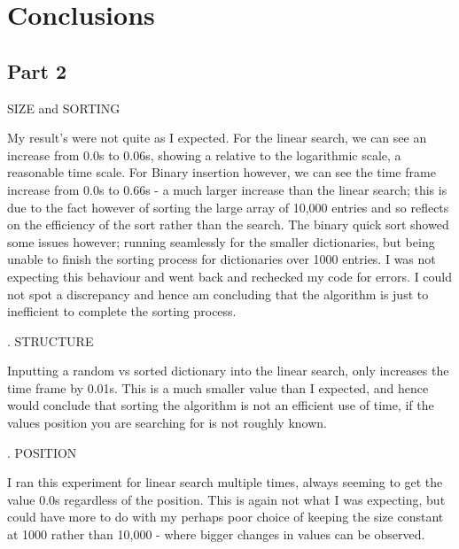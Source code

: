 \documentclass{article}
\begin{document}
\section{Conclusions}
\label{sec:conclusions}

\subsection{Part 2}


SIZE and SORTING\newline


My result's were not quite as I expected. For the linear search, we can see an increase from 0.0s to 0.06s, showing a relative to the logarithmic scale, a reasonable time scale. For Binary insertion however, we can see the time frame increase from 0.0s to 0.66s - a much larger increase than the linear search; this is due to the fact however of sorting the large array of 10,000 entries and so reflects on the efficiency of the sort rather than the search. The binary quick sort showed some issues however; running seamlessly for the smaller dictionaries, but being unable to finish the sorting process for dictionaries over 1000 entries. I was not expecting this behaviour and went back and rechecked my code for errors. I could not spot a discrepancy and hence am concluding that the algorithm is just to inefficient to complete the sorting process.\par
.\newline
STRUCTURE\newline


Inputting a random vs sorted dictionary into the linear search, only increases the time frame by 0.01s. This is a much smaller value than I expected, and hence would conclude that sorting the algorithm is not an efficient use of time, if the values position you are searching for is not roughly known.\par
.\newline
POSITION\newline


I ran this experiment for linear search multiple times, always seeming to get the value 0.0s regardless of the position. This is again not what I was expecting, but could have more to do with my perhaps poor choice of keeping the size constant at 1000 rather than 10,000 - where bigger changes in values can be observed.\par
\end{document}
